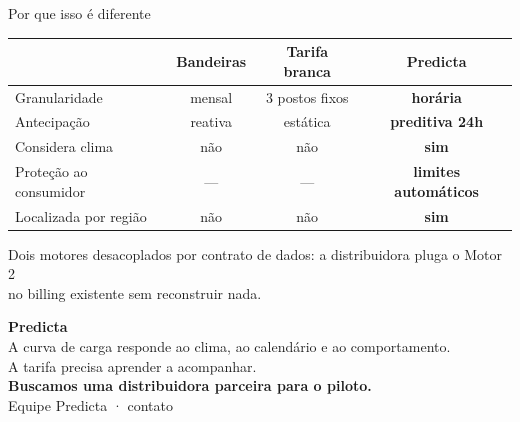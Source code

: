 \documentclass[aspectratio=169,11pt]{beamer}
\begin{document}
\begin{frame}{Por que isso é diferente}
  \begin{table}
    \centering\small
    \begin{tabular}{lccc}
      \toprule
       & \textbf{Bandeiras} & \textbf{Tarifa branca} & \textbf{Predicta} \\
      \midrule
      Granularidade & mensal & 3 postos fixos & \textbf{horária} \\
      Antecipação & reativa & estática & \textbf{preditiva 24h} \\
      Considera clima & não & não & \textbf{sim} \\
      Proteção ao consumidor & — & — & \textbf{limites automáticos} \\
      Localizada por região & não & não & \textbf{sim} \\
      \bottomrule
    \end{tabular}
  \end{table}
  \vspace{3mm}
  \centering
  {\small Dois motores desacoplados por contrato de dados: a distribuidora pluga o Motor 2\\ no billing existente sem reconstruir nada.}
\end{frame}

\begin{frame}{}
  \centering
  \vspace{8mm}
  {\Huge\textbf{\textcolor{predicta}{Predicta}}}\\[4mm]
  {\Large A curva de carga responde ao clima, ao calendário e ao comportamento.\\[1mm] A tarifa precisa aprender a acompanhar.}\\[8mm]
  {\large\textcolor{verde}{\textbf{Buscamos uma distribuidora parceira para o piloto.}}}\\[6mm]
  {\small\textcolor{cinza}{Equipe Predicta · contato}}
\end{frame}
\end{document}
